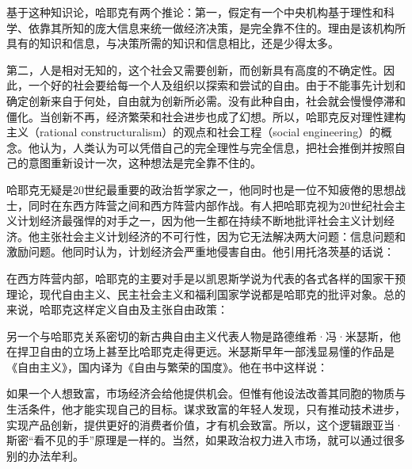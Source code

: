 基于这种知识论，哈耶克有两个推论：第一，假定有一个中央机构基于理性和科学、依靠其所知的庞大信息来统一做经济决策，是完全靠不住的。理由是该机构所具有的知识和信息，与决策所需的知识和信息相比，还是少得太多。

第二，人是相对无知的，这个社会又需要创新，而创新具有高度的不确定性。因此，一个好的社会要给每一个人及组织以探索和尝试的自由。由于不能事先计划和确定创新来自于何处，自由就为创新所必需。没有此种自由，社会就会慢慢停滞和僵化。当创新不再，经济繁荣和社会进步也成了幻想。所以，哈耶克反对理性建构主义（rational constructuralism）的观点和社会工程（social engineering）的概念。他认为，人类认为可以凭借自己的完全理性与完全信息，把社会推倒并按照自己的意图重新设计一次，这种想法是完全靠不住的。

哈耶克无疑是20世纪最重要的政治哲学家之一，他同时也是一位不知疲倦的思想战士，同时在东西方阵营之间和西方阵营内部作战。有人把哈耶克视为20世纪社会主义计划经济最强悍的对手之一，因为他一生都在持续不断地批评社会主义计划经济。他主张社会主义计划经济的不可行性，因为它无法解决两大问题：信息问题和激励问题。他同时认为，计划经济会严重地侵害自由。他引用托洛茨基的话说：


在西方阵营内部，哈耶克的主要对手是以凯恩斯学说为代表的各式各样的国家干预理论，现代自由主义、民主社会主义和福利国家学说都是哈耶克的批评对象。总的来说，哈耶克这样定义自由及主张自由政策：


另一个与哈耶克关系密切的新古典自由主义代表人物是路德维希·冯·米瑟斯，他在捍卫自由的立场上甚至比哈耶克走得更远。米瑟斯早年一部浅显易懂的作品是《自由主义》，国内译为《自由与繁荣的国度》。他在书中这样说：


如果一个人想致富，市场经济会给他提供机会。但惟有他设法改善其同胞的物质与生活条件，他才能实现自己的目标。谋求致富的年轻人发现，只有推动技术进步，实现产品创新，提供更好的消费者价值，才有机会致富。所以，这个逻辑跟亚当·斯密“看不见的手”原理是一样的。当然，如果政治权力进入市场，就可以通过很多别的办法牟利。

